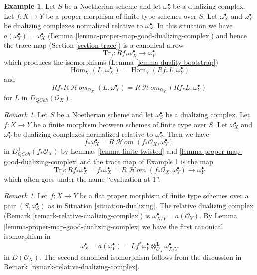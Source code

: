 \documentclass{stacks-project}
\theoremstyle{plain}
\theoremstyle{definition}
\newtheorem{example}[subsection]{Example}
\theoremstyle{remark}
\newtheorem{remark}[subsection]{Remark}
\numberwithin{equation}{subsection}
\def\Hom{\mathop{\mathrm{Hom}}\nolimits}
\def\SheafHom{\mathop{\mathcal{H}\!\mathit{om}}\nolimits}
\def\QCoh{\mathit{QCoh}}
\begin{document}
\begin{example}
\label{example-trace-proper}
Let $S$ be a Noetherian scheme and let $\omega_S^\bullet$ be a
dualizing complex. Let $f : X \to Y$ be a proper morphism of finite
type schemes over $S$. Let $\omega_X^\bullet$ and $\omega_Y^\bullet$
be dualizing complexes normalized relative to $\omega_S^\bullet$.
In this situation we have $a(\omega_Y^\bullet) = \omega_X^\bullet$
(Lemma \ref{lemma-proper-map-good-dualizing-complex})
and hence the trace map (Section \ref{section-trace}) is a canonical arrow
$$
\text{Tr}_f : Rf_*\omega_X^\bullet \longrightarrow \omega_Y^\bullet
$$
which produces the isomorphisms (Lemma \ref{lemma-duality-bootstrap})
$$
\Hom_X(L, \omega_X^\bullet) = \Hom_Y(Rf_*L, \omega_Y^\bullet)
$$
and
$$
Rf_*R\SheafHom_{\mathcal{O}_X}(L, \omega_X^\bullet) =
R\SheafHom_{\mathcal{O}_Y}(Rf_*L, \omega_Y^\bullet)
$$
for $L$ in $D_\QCoh(\mathcal{O}_X)$.
\end{example}

\begin{remark}
\label{remark-dualizing-finite}
Let $S$ be a Noetherian scheme and let $\omega_S^\bullet$ be a dualizing
complex. Let $f : X \to Y$ be a finite morphism between schemes of finite
type over $S$. Let $\omega_X^\bullet$ and $\omega_Y^\bullet$ be
dualizing complexes normalized relative to $\omega_S^\bullet$.
Then we have
$$
f_*\omega_X^\bullet = R\SheafHom(f_*\mathcal{O}_X, \omega_Y^\bullet)
$$
in $D_\QCoh^+(f_*\mathcal{O}_X)$ by Lemmas \ref{lemma-finite-twisted} and
\ref{lemma-proper-map-good-dualizing-complex}
and the trace map of Example \ref{example-trace-proper} is the map
$$
\text{Tr}_f : Rf_*\omega_X^\bullet = f_*\omega_X^\bullet =
R\SheafHom(f_*\mathcal{O}_X, \omega_Y^\bullet) \longrightarrow
\omega_Y^\bullet
$$
which often goes under the name ``evaluation at $1$''.
\end{remark}

\begin{remark}
\label{remark-relative-dualizing-complex-shriek}
Let $f : X \to Y$ be a flat proper morphism of finite type
schemes over a pair $(S, \omega_S^\bullet)$ as in
Situation \ref{situation-dualizing}. The relative dualizing complex
(Remark \ref{remark-relative-dualizing-complex}) is
$\omega_{X/Y}^\bullet = a(\mathcal{O}_Y)$. By
Lemma \ref{lemma-proper-map-good-dualizing-complex}
we have the first canonical isomorphism in
$$
\omega_X^\bullet = a(\omega_Y^\bullet) =
Lf^*\omega_Y^\bullet \otimes_{\mathcal{O}_X}^\mathbf{L} \omega_{X/Y}^\bullet
$$
in $D(\mathcal{O}_X)$. The second canonical isomorphism follows from the
discussion in Remark \ref{remark-relative-dualizing-complex}.
\end{remark}
\end{document}
